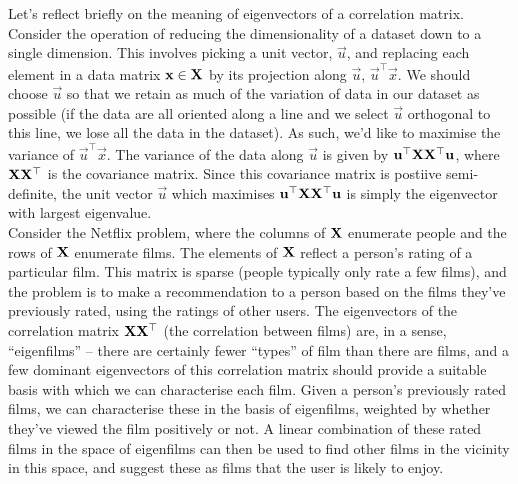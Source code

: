 Let's reflect briefly on the meaning of eigenvectors of a correlation
matrix. Consider the operation of reducing the dimensionality of a dataset
down to a single dimension. This involves picking a unit vector, $\vec{u}$,
and replacing each element in a data matrix $\mathbf{x}\in\mathbf{X}$ by its
projection along $\vec{u}$, $\vec{u}^\top\vec{x}$. We should choose $\vec{u}$
so that we retain as much of the variation of data in our dataset as possible
(if the data are all oriented along a line and we select $\vec{u}$ orthogonal
to this line, we lose all the data in the dataset). As such, we'd like to maximise
the variance of $\vec{u}^\top\vec{x}$. The variance of the data along $\vec{u}$
is given by $\mathbf{u}^\top\mathbf{X}\mathbf{X}^\top\mathbf{u}$, where $\mathbf{X}\mathbf{X}^\top$
is the covariance matrix. Since this covariance matrix is postiive semi-definite,
the unit vector $\vec{u}$ which maximises $\mathbf{u}^\top\mathbf{X}\mathbf{X}^\top\mathbf{u}$
is simply the eigenvector with largest eigenvalue.\\

Consider the Netflix problem, where the columns of $\mathbf{X}$ enumerate people
and the rows of $\mathbf{X}$ enumerate films. The elements of $\mathbf{X}$ reflect
a person's rating of a particular film. This matrix is sparse (people typically
only rate a few films), and the problem is to make a recommendation to a person
based on the films they've previously rated, using the ratings of other users.
The eigenvectors of the correlation matrix $\mathbf{X}\mathbf{X}^\top$ (the correlation
between films) are, in a sense, ``eigenfilms'' -- there are certainly fewer
``types'' of film than there are films, and a few dominant eigenvectors of this
correlation matrix should provide a suitable basis with which we can characterise
each film. Given a person's previously rated films, we can characterise these
in the basis of eigenfilms, weighted by whether they've viewed the film
positively or not. A linear combination of these rated films in the space of
eigenfilms can then be used to find other films in the vicinity in this space,
and suggest these as films that the user is likely to enjoy.
